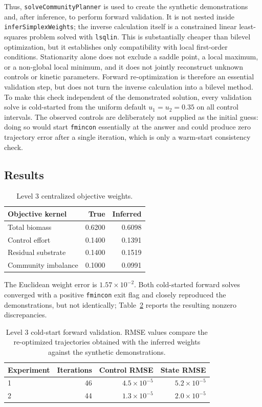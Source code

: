 \documentclass[11pt,a4paper]{article}
\begin{document}
Thus, \texttt{solveCommunityPlanner} is used to create the synthetic
demonstrations and, after inference, to perform forward validation. It is not
nested inside \texttt{inferSimplexWeights}; the inverse calculation itself is
a constrained linear least-squares problem solved with \texttt{lsqlin}. This
is substantially cheaper than bilevel optimization, but it establishes only
compatibility with local first-order conditions. Stationarity alone does not
exclude a saddle point, a local maximum, or a non-global local minimum, and it
does not jointly reconstruct unknown controls or kinetic parameters. Forward
re-optimization is therefore an essential validation step, but does not turn
the inverse calculation into a bilevel method. To make this check independent
of the demonstrated solution, every validation solve is cold-started from the
uniform default \(u_1=u_2=0.35\) on all control intervals. The observed
controls are deliberately not supplied as the initial guess: doing so would
start \texttt{fmincon} essentially at the answer and could produce zero
trajectory error after a single iteration, which is only a warm-start
consistency check.

\subsection{Results}

\begin{table}[H]
\centering
\caption{Level 3 centralized objective weights.}
\label{tab:level3}
\begin{tabular}{lrr}
\toprule
Objective kernel & True & Inferred\\
\midrule
Total biomass & 0.6200 & 0.6098\\
Control effort & 0.1400 & 0.1391\\
Residual substrate & 0.1400 & 0.1519\\
Community imbalance & 0.1000 & 0.0991\\
\bottomrule
\end{tabular}
\end{table}

The Euclidean weight error is \(1.57\times10^{-2}\). Both cold-started forward
solves converged with a positive \texttt{fmincon} exit flag and closely
reproduced the demonstrations, but not identically; Table~\ref{tab:level3-validation}
reports the resulting nonzero discrepancies.

\begin{table}[H]
\centering
\caption{Level 3 cold-start forward validation. RMSE values compare the
re-optimized trajectories obtained with the inferred weights against the
synthetic demonstrations.}
\label{tab:level3-validation}
\begin{tabular}{lrrr}
\toprule
Experiment & Iterations & Control RMSE & State RMSE\\
\midrule
1 & 46 & \(4.5\times10^{-5}\) & \(5.2\times10^{-5}\)\\
2 & 44 & \(1.3\times10^{-5}\) & \(2.0\times10^{-5}\)\\
\bottomrule
\end{tabular}
\end{table}
\end{document}
